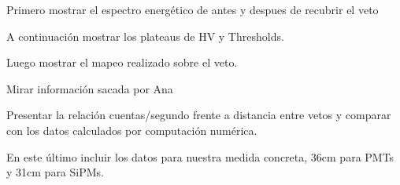 Primero mostrar el espectro energético de antes y despues de recubrir el veto

A continuación mostrar los plateaus de HV y Thresholds.

Luego mostrar el mapeo realizado sobre el veto.

Mirar información sacada por Ana

Presentar la relación cuentas/segundo frente a distancia entre vetos y comparar con los datos calculados por computación numérica.

En este último incluir los datos para nuestra medida concreta, 36cm para PMTs y 31cm para SiPMs.
